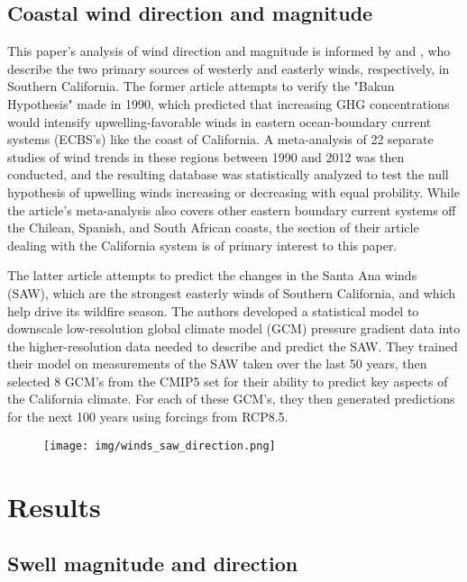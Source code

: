 \documentclass[12pt, letterpaper]{article}
\begin{document}
	\subsection {Coastal wind direction and magnitude}
	This paper's analysis of wind direction and magnitude is informed by \citet{winds-coastal} and \citet{winds-santa-ana}, who describe the two primary sources of westerly and easterly winds, respectively, in Southern California. The former article attempts to verify the "Bakun Hypothesis" made in 1990, which predicted that increasing GHG concentrations would intensify upwelling-favorable winds in eastern ocean-boundary current systems (ECBS's) like the coast of California. A meta-analysis of 22 separate studies of wind trends in these regions between 1990 and 2012 was then conducted, and the resulting database was statistically analyzed to test the null hypothesis of upwelling winds increasing or decreasing with equal probility. While the article's meta-analysis also covers other eastern boundary current systems off the Chilean, Spanish, and South African coasts, the section of their article dealing with the California system is of primary interest to this paper. \citep{winds-coastal}

	The latter article \citep{winds-santa-ana} attempts to predict the changes in the Santa Ana winds (SAW), which are the strongest easterly winds of Southern California, and which help drive its wildfire season. The authors developed a statistical model to downscale low-resolution global climate model (GCM) pressure gradient data into the higher-resolution data needed to describe and predict the SAW. They trained their model on measurements of the SAW taken over the last 50 years, then selected 8 GCM's from the CMIP5 set for their ability to predict key aspects of the California climate. For each of these GCM's, they then generated predictions for the next 100 years using forcings from RCP8.5. \citep{winds-santa-ana}

	\begin{figure}[h]
		\centering
		\texttt{[image: img/winds\_saw\_direction.png]}
		\caption{\citep{winds-santa-ana}}
	\end{figure}

	\section{Results}
	\subsection{Swell magnitude and direction}
\end{document}
